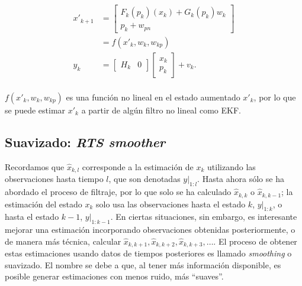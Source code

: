 \begin{equation}\label{eq:sistema-aumentado}
\begin{aligned}
x'_{k+1} &= \begin{bmatrix} F_k(p_k)(x_k) + G_k(p_k)w_k \\ p_k + w_{pn} \end{bmatrix} \\
&= f(x'_{k}, w_k, w_{kp}) \\
y_{k} &= \begin{bmatrix} H_k & 0 \end{bmatrix} \begin{bmatrix}x_k \\ p_k \end{bmatrix} + v_k. \\ 
\end{aligned}
\end{equation}

\(f(x'_{k}, w_k, w_{kp}) \) es una función no lineal en el estado aumentado \(x'_k\), por lo que se puede estimar \(x'_k\) a partir de algún filtro no lineal como EKF.


\subsection{Suavizado: \textit{RTS smoother}} \label{smoother}


Recordamos que \(\hat{x}_{k,l}\) corresponde a la estimación de \(x_k\) utilizando las observaciones hasta tiempo \(l\), que son denotadas \(\left. y \right|_{1:l}\). Hasta ahora sólo se ha abordado el proceso de filtraje, por lo que solo se ha calculado \(\hat{x}_{k,k}\) o \(\hat{x}_{k, k-1}\); la estimación del estado \(x_k\) solo usa las observaciones hasta el estado \(k\), \(\left. y \right|_{1:k}\), o hasta el estado \(k-1\),   \(\left. y \right|_{1:k-1}\). En ciertas situaciones, sin embargo, es interesante mejorar una estimación incorporando observaciones obtenidas posteriormente, o de manera más técnica, calcular \(\hat{x}_{k, k+1}, \hat{x}_{k, k+2}, \hat{x}_{k, k+3}, \dots\). El proceso de obtener estas estimaciones usando datos de tiempos posteriores es llamado \textit{smoothing} o suavizado. El nombre se debe a que, al tener más información disponible, es posible generar estimaciones con menos ruido, más ``suaves''.


